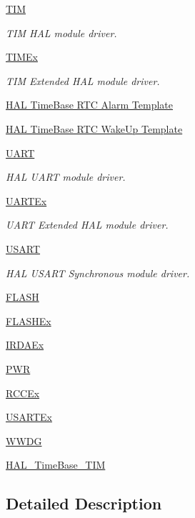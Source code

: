 \begin{DoxyCompactItemize}
\hyperlink{group___t_i_m}{T\+IM}
\begin{DoxyCompactList}\small\item\em T\+IM H\+AL module driver. \end{DoxyCompactList}\item 
\hyperlink{group___t_i_m_ex}{T\+I\+M\+Ex}
\begin{DoxyCompactList}\small\item\em T\+IM Extended H\+AL module driver. \end{DoxyCompactList}\item 
\hyperlink{group___h_a_l___time_base___r_t_c___alarm___template}{H\+A\+L Time\+Base R\+T\+C Alarm Template}
\item 
\hyperlink{group___h_a_l___time_base___r_t_c___wake_up___template}{H\+A\+L Time\+Base R\+T\+C Wake\+Up Template}
\item 
\hyperlink{group___u_a_r_t}{U\+A\+RT}
\begin{DoxyCompactList}\small\item\em H\+AL U\+A\+RT module driver. \end{DoxyCompactList}\item 
\hyperlink{group___u_a_r_t_ex}{U\+A\+R\+T\+Ex}
\begin{DoxyCompactList}\small\item\em U\+A\+RT Extended H\+AL module driver. \end{DoxyCompactList}\item 
\hyperlink{group___u_s_a_r_t}{U\+S\+A\+RT}
\begin{DoxyCompactList}\small\item\em H\+AL U\+S\+A\+RT Synchronous module driver. \end{DoxyCompactList}\item 
\hyperlink{group___f_l_a_s_h}{F\+L\+A\+SH}
\item 
\hyperlink{group___f_l_a_s_h_ex}{F\+L\+A\+S\+H\+Ex}
\item 
\hyperlink{group___i_r_d_a_ex}{I\+R\+D\+A\+Ex}
\item 
\hyperlink{group___p_w_r}{P\+WR}
\item 
\hyperlink{group___r_c_c_ex}{R\+C\+C\+Ex}
\item 
\hyperlink{group___u_s_a_r_t_ex}{U\+S\+A\+R\+T\+Ex}
\item 
\hyperlink{group___w_w_d_g}{W\+W\+DG}
\item 
\hyperlink{group___h_a_l___time_base___t_i_m}{H\+A\+L\+\_\+\+Time\+Base\+\_\+\+T\+IM}
\end{DoxyCompactItemize}


\subsection{Detailed Description}
